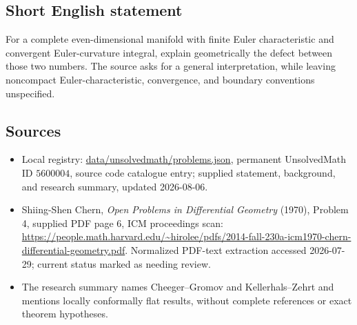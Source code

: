 \documentclass[11pt]{article}
\begin{document}
\subsection{Short English statement}
For a complete even-dimensional manifold with finite Euler characteristic and convergent Euler-curvature integral, explain geometrically the defect between those two numbers. The source asks for a general interpretation, while leaving noncompact Euler-characteristic, convergence, and boundary conventions unspecified.
\subsection{Sources}
\begin{itemize}
\item Local registry: \url{data/unsolvedmath/problems.json}, permanent UnsolvedMath ID \(5600004\), source code catalogue entry; supplied statement, background, and research summary, updated 2026-08-06.
\item Shiing-Shen Chern, \emph{Open Problems in Differential Geometry} (1970), Problem 4, supplied PDF page 6, ICM proceedings scan: \url{https://people.math.harvard.edu/~hirolee/pdfs/2014-fall-230a-icm1970-chern-differential-geometry.pdf}. Normalized PDF-text extraction accessed 2026-07-29; current status marked as needing review.
\item The research summary names Cheeger--Gromov and Kellerhals--Zehrt and mentions locally conformally flat results, without complete references or exact theorem hypotheses.
\end{itemize}
\end{document}

